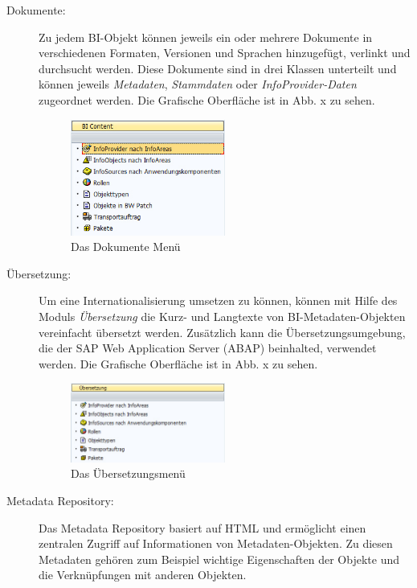 \begin{description}
\item[Dokumente:] Zu jedem BI-Objekt können jeweils ein oder mehrere Dokumente in verschiedenen Formaten, Versionen und Sprachen hinzugefügt, verlinkt und durchsucht werden. Diese Dokumente sind in drei Klassen unterteilt und können jeweils \textit{Metadaten}, \textit{Stammdaten} oder \textit{InfoProvider-Daten} zugeordnet werden.
Die Grafische Oberfläche ist in Abb. x zu sehen.
\begin{figure}[H]
    \centering
    \includegraphics[width=0.5\textwidth]{files/BIContent}
    \caption{Das Dokumente Menü}
    \label{pic:DWOverview}
\end{figure}
\item[Übersetzung:] Um eine Internationalisierung umsetzen zu können, können mit Hilfe des Moduls \textit{Übersetzung} die Kurz- und Langtexte von BI-Metadaten-Objekten vereinfacht übersetzt werden. Zusätzlich kann die Übersetzungsumgebung, die der SAP Web Application Server (ABAP) beinhalted, verwendet werden.
Die Grafische Oberfläche ist in Abb. x zu sehen.
\begin{figure}[H]
    \centering
    \includegraphics[width=0.5\textwidth]{files/Uebersetzung}
    \caption{Das Übersetzungsmenü}
    \label{pic:DWOverview}
\end{figure}
\item[Metadata Repository:] Das Metadata Repository basiert auf HTML und ermöglicht einen zentralen Zugriff auf Informationen von Metadaten-Objekten. Zu diesen Metadaten gehören zum Beispiel wichtige Eigenschaften der Objekte und die Verknüpfungen mit anderen Objekten.
\end{description}

